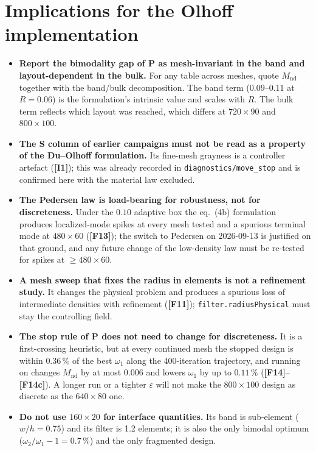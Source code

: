 \documentclass[10pt,a4paper]{article}
\newcommand{\Mnd}{M_{\mathrm{nd}}}
\newcommand{\code}[1]{\texttt{\small #1}}
\newcommand{\fact}[1]{\textbf{[F#1]}}
\newcommand{\interp}[1]{\textbf{[I#1]}}
\begin{document}
\section{Implications for the Olhoff implementation}\label{sec:impl}

\begin{itemize}
\item \textbf{Report the bimodality gap of P as mesh-invariant in the band and layout-dependent in the bulk.} For any table across meshes, quote $\Mnd$ together with the band/bulk decomposition. The band term ($0.09$--$0.11$ at $R=0.06$) is the formulation's intrinsic value and scales with $R$. The bulk term reflects which layout was reached, which differs at $720\times90$ and $800\times100$.
\item \textbf{The S column of earlier campaigns must not be read as a property of the Du--Olhoff formulation.} Its fine-mesh grayness is a controller artefact (\interp{1}); this was already recorded in \code{diagnostics/move\_stop} and is confirmed here with the material law excluded.
\item \textbf{The Pedersen law is load-bearing for robustness, not for discreteness.} Under the $0.10$ adaptive box the eq.~(4b) formulation produces localized-mode spikes at every mesh tested and a spurious terminal mode at $480\times60$ (\fact{13}); the switch to Pedersen on 2026-09-13 is justified on that ground, and any future change of the low-density law must be re-tested for spikes at $\ge480\times60$.
\item \textbf{A mesh sweep that fixes the radius in elements is not a refinement study.} It changes the physical problem and produces a spurious loss of intermediate densities with refinement (\fact{11}); \code{filter.radiusPhysical} must stay the controlling field.
\item \textbf{The stop rule of P does not need to change for discreteness.} It is a first-crossing heuristic, but at every continued mesh the stopped design is within $0.36\,\%$ of the best $\omega_1$ along the 400-iteration trajectory, and running on changes $\Mnd$ by at most $0.006$ and lowers $\omega_1$ by up to $0.11\,\%$ (\fact{14}--\fact{14c}). A longer run or a tighter $\varepsilon$ will not make the $800\times100$ design as discrete as the $640\times80$ one.
\item \textbf{Do not use $160\times20$ for interface quantities.} Its band is sub-element ($w/h=0.75$) and its filter is 1.2 elements; it is also the only bimodal optimum ($\omega_2/\omega_1-1=0.7\,\%$) and the only fragmented design.
\end{itemize}
\end{document}
